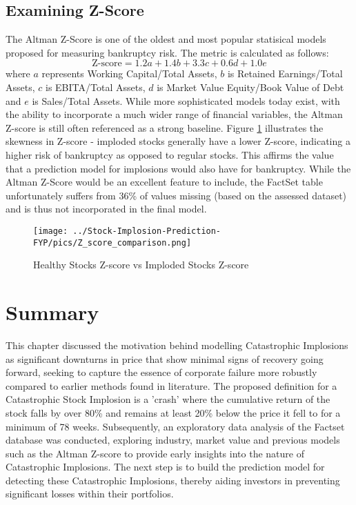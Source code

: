 \documentclass[a4paper]{report}
\begin{document}
\subsection{Examining Z-Score}
The Altman Z-Score is one of the oldest and most popular statisical models proposed for measuring bankruptcy risk. The metric is calculated as follows:
\begin{equation}
  \text{Z-score} = 1.2a + 1.4b + 3.3c + 0.6d + 1.0e
\end{equation} \label{eq:z-score}
where \(a\) represents Working Capital/Total Assets, \(b\) is Retained Earnings/Total Assets, \(c\) is EBITA/Total Assets, 
\(d\) is Market Value Equity/Book Value of Debt and \(e\) is Sales/Total Assets. While more sophisticated models today exist, with the 
ability to incorporate a much wider range of financial variables, the Altman Z-score is still often referenced as a strong baseline. Figure 
\ref{fig:Z_score} illustrates the skewness in Z-score - imploded stocks generally have a lower Z-score, indicating a higher risk of bankruptcy as opposed 
to regular stocks. This affirms the value that a prediction model for implosions would also have for bankruptcy. While the Altman Z-Score would be an excellent 
feature to include, the FactSet table unfortunately suffers from 36\% of values missing (based on the assessed dataset) and is thus not incorporated in the final model.


\begin{figure}[htbp]
  \centering
  \texttt{[image: ../Stock-Implosion-Prediction-FYP/pics/Z\_score\_comparison.png]} 
  \caption{Healthy Stocks Z-score vs Imploded Stocks Z-score} 
  \label{fig:Z_score} 
\end{figure}

\section{Summary}
This chapter discussed the motivation behind modelling Catastrophic Implosions as significant downturns in price that show minimal 
signs of recovery going forward, seeking to capture the essence of corporate failure more robustly compared to earlier methods found in literature. The proposed definition 
for a Catastrophic Stock Implosion is a 'crash' where the cumulative return of the stock falls by over 80\% and remains at least 20\% below the price it fell to for a minimum of 78 weeks. 
Subsequently, an exploratory data analysis of the Factset database was conducted, exploring industry, market value and previous models such as the Altman Z-score to
provide early insights into the nature of Catastrophic Implosions. The next step is to build the prediction model for detecting these Catastrophic Implosions, thereby aiding
investors in preventing significant losses within their portfolios. 
\end{document}
